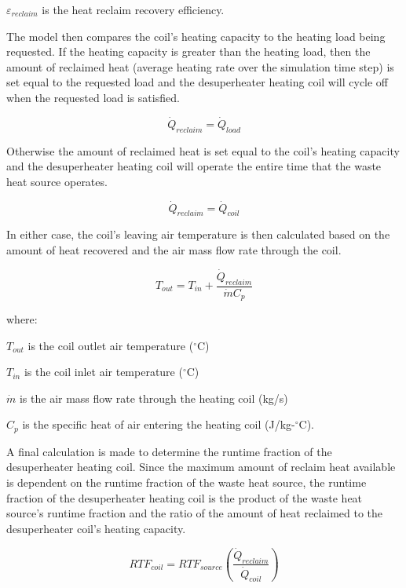 \({\varepsilon_{reclaim}}\) is the heat reclaim recovery efficiency.

The model then compares the coil's heating capacity to the heating load being requested. If the heating capacity is greater than the heating load, then the amount of reclaimed heat (average heating rate over the simulation time step) is set equal to the requested load and the desuperheater heating coil will cycle off when the requested load is satisfied.

\begin{equation}
{\dot Q_{reclaim}} = {\dot Q_{load}}
\end{equation}

Otherwise the amount of reclaimed heat is set equal to the coil's heating capacity and the desuperheater heating coil will operate the entire time that the waste heat source operates.

\begin{equation}
{\dot Q_{reclaim}} = {\dot Q_{coil}}
\end{equation}

In either case, the coil's leaving air temperature is then calculated based on the amount of heat recovered and the air mass flow rate through the coil.

\begin{equation}
{T_{out}} = {T_{in}} + \frac{{{{\dot Q}_{reclaim}}}}{{\dot m{C_p}}}
\end{equation}

where:

\({T_{out}}\) is the coil outlet air temperature (\(^{\circ}\)C)

\({T_{in}}\) is the coil inlet air temperature (\(^{\circ}\)C)

\(\dot m\) is the air mass flow rate through the heating coil (kg/s)

\({C_p}\) is the specific heat of air entering the heating coil (J/kg-\(^{\circ}\)C).

A final calculation is made to determine the runtime fraction of the desuperheater heating coil. Since the maximum amount of reclaim heat available is dependent on the runtime fraction of the waste heat source, the runtime fraction of the desuperheater heating coil is the product of the waste heat source's runtime fraction and the ratio of the amount of heat reclaimed to the desuperheater coil's heating capacity.

\begin{equation}
RT{F_{coil}} = RT{F_{source}}\left( {\frac{{{{\dot Q}_{reclaim}}}}{{{{\dot Q}_{coil}}}}} \right)
\end{equation}

